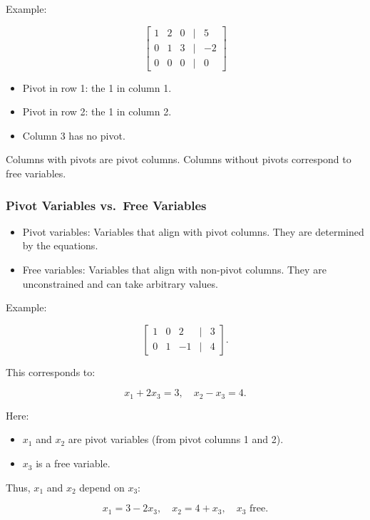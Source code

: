 \documentclass[
  letterpaper,
  DIV=11,
  numbers=noendperiod]{scrreprt}
\providecommand{\tightlist}{%
  \setlength{\itemsep}{0pt}\setlength{\parskip}{0pt}}
\begin{document}
Example:

\[
\begin{bmatrix}  
1 & 2 & 0 & | & 5 \\  
0 & 1 & 3 & | & -2 \\  
0 & 0 & 0 & | & 0  
\end{bmatrix}
\]

\begin{itemize}
\tightlist
\item
  Pivot in row 1: the 1 in column 1.
\item
  Pivot in row 2: the 1 in column 2.
\item
  Column 3 has no pivot.
\end{itemize}

Columns with pivots are pivot columns. Columns without pivots correspond
to free variables.

\subsubsection{Pivot Variables vs.~Free
Variables}\label{pivot-variables-vs.-free-variables}

\begin{itemize}
\tightlist
\item
  Pivot variables: Variables that align with pivot columns. They are
  determined by the equations.
\item
  Free variables: Variables that align with non-pivot columns. They are
  unconstrained and can take arbitrary values.
\end{itemize}

Example:

\[
\begin{bmatrix}  
1 & 0 & 2 & | & 3 \\  
0 & 1 & -1 & | & 4  
\end{bmatrix}.
\]

This corresponds to:

\[
x_1 + 2x_3 = 3, \quad x_2 - x_3 = 4.
\]

Here:

\begin{itemize}
\tightlist
\item
  \(x_1\) and \(x_2\) are pivot variables (from pivot columns 1 and 2).
\item
  \(x_3\) is a free variable.
\end{itemize}

Thus, \(x_1\) and \(x_2\) depend on \(x_3\):

\[
x_1 = 3 - 2x_3, \quad x_2 = 4 + x_3, \quad x_3 \text{ free}.
\]
\end{document}

